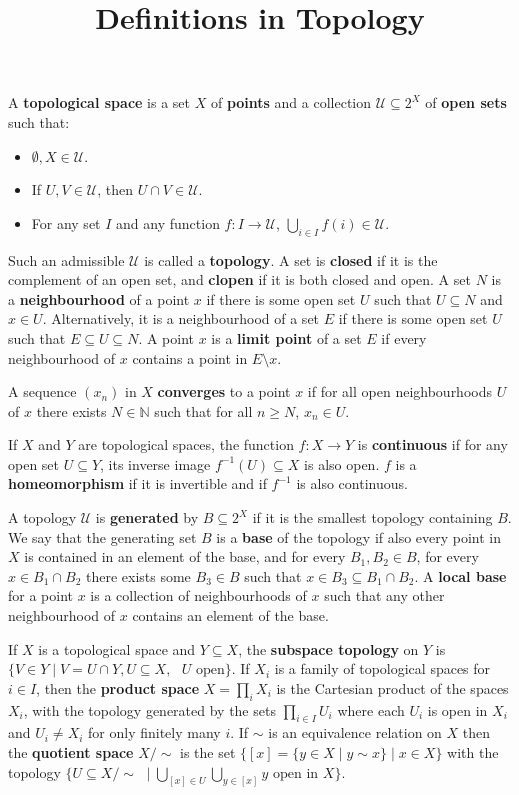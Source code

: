 \documentclass[12pt]{article}
\title{Definitions in Topology}
\author{}
\date{}
\newcommand{\N}{\mathbb{N}}
\newcommand{\U}{\mathcal{U}}
\begin{document}

\maketitle

\vspace{-6ex}

A \textbf{topological space} is a set $X$ of \textbf{points} and a collection $\U \subseteq 2^X$ of \textbf{open sets} such that:
\begin{itemize}
\item $\emptyset, X \in \U$.
\item If $U, V \in \U$, then $U \cap V \in \U$.
\item For any set $I$ and any function $f: I \rightarrow \U$, $\bigcup_{i \in I} f(i) \in \U$.
\end{itemize}
Such an admissible $\U$ is called a \textbf{topology}. A set is \textbf{closed} if it is the complement of an open set, and \textbf{clopen} if it is both closed and open. A set $N$ is a \textbf{neighbourhood} of a point $x$ if there is some open set $U$ such that $U \subseteq N$ and $x \in U$. Alternatively, it is a neighbourhood of a set $E$ if there is some open set $U$ such that $E \subseteq U \subseteq N$. A point $x$ is a \textbf{limit point} of a set $E$ if every neighbourhood of $x$ contains a point in $E \setminus {x}$.

A sequence $(x_n)$ in $X$ \textbf{converges} to a point $x$ if for all open neighbourhoods $U$ of $x$ there exists $N \in \N$ such that for all $n \geq N$, $x_n \in U$.

If $X$ and $Y$ are topological spaces, the function $f: X \rightarrow Y$ is \textbf{continuous} if for any open set $U \subseteq Y$, its inverse image $f^{-1}(U) \subseteq X$ is also open. $f$ is a \textbf{homeomorphism} if it is invertible and if $f^{-1}$ is also continuous.

A topology $\U$ is \textbf{generated} by $B \subseteq 2^X$ if it is the smallest topology containing $B$. We say that the generating set $B$ is a \textbf{base} of the topology if also every point in $X$ is contained in an element of the base, and for every $B_1, B_2 \in B$, for every $x \in B_1 \cap B_2$ there exists some $B_3 \in B$ such that $x \in B_3 \subseteq B_1 \cap B_2$. A \textbf{local base} for a point $x$ is a collection of neighbourhoods of $x$ such that any other neighbourhood of $x$ contains an element of the base.

If $X$ is a topological space and $Y \subseteq X$, the \textbf{subspace topology} on $Y$ is $\{V \in Y \mid V = U \cap Y, U \subseteq X, \text{ $U$ open}\}$. If $X_i$ is a family of topological spaces for $i \in I$, then the \textbf{product space} $X = \prod_{i} X_i$ is the Cartesian product of the spaces $X_i$, with the topology generated by the sets $\prod_{i \in I} U_i$ where each $U_i$ is open in $X_i$ and $U_i \neq X_i$ for only finitely many $i$. If $\sim$ is an equivalence relation on $X$ then the \textbf{quotient space} $X / \sim$ is the set $\{[x] = \{y \in X \mid y \sim x\} \mid x \in X\}$ with the topology $\{U \subseteq X / \sim \, \, \mid \bigcup_{[x] \in U} \bigcup_{y \in [x]} y \text{ open in $X$}\}$.
\end{document}
